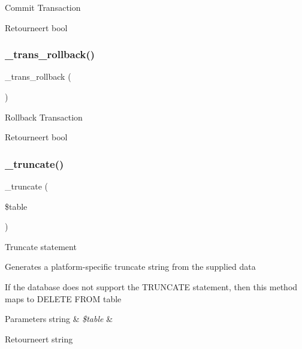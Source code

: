Commit Transaction

\begin{DoxyReturn}{Retourneert}
bool 
\end{DoxyReturn}
\mbox{\label{class_c_i___d_b__ibase__driver_ad49a116b0776c26b53114c9093fd102a}} 
\subsubsection{\texorpdfstring{\_trans\_rollback()}{\_trans\_rollback()}}
{\footnotesize\ttfamily \+\_\+trans\+\_\+rollback (\begin{DoxyParamCaption}{ }\end{DoxyParamCaption})\hspace{0.3cm}{\ttfamily [protected]}}

Rollback Transaction

\begin{DoxyReturn}{Retourneert}
bool 
\end{DoxyReturn}
\mbox{\label{class_c_i___d_b__ibase__driver_aa029600528fc1ce660a23ff4b4667f95}} 
\subsubsection{\texorpdfstring{\_truncate()}{\_truncate()}}
{\footnotesize\ttfamily \+\_\+truncate (\begin{DoxyParamCaption}\item[{}]{\$table }\end{DoxyParamCaption})\hspace{0.3cm}{\ttfamily [protected]}}

Truncate statement

Generates a platform-\/specific truncate string from the supplied data

If the database does not support the T\+R\+U\+N\+C\+A\+TE statement, then this method maps to \textquotesingle{}D\+E\+L\+E\+TE F\+R\+OM table\textquotesingle{}


\begin{DoxyParams}[1]{Parameters}
string & {\em \$table} & \\
\hline
\end{DoxyParams}
\begin{DoxyReturn}{Retourneert}
string 
\end{DoxyReturn}
\mbox{\label{class_c_i___d_b__ibase__driver_a2540b03a93fa73ae74c10d0e16fc073e}} 
